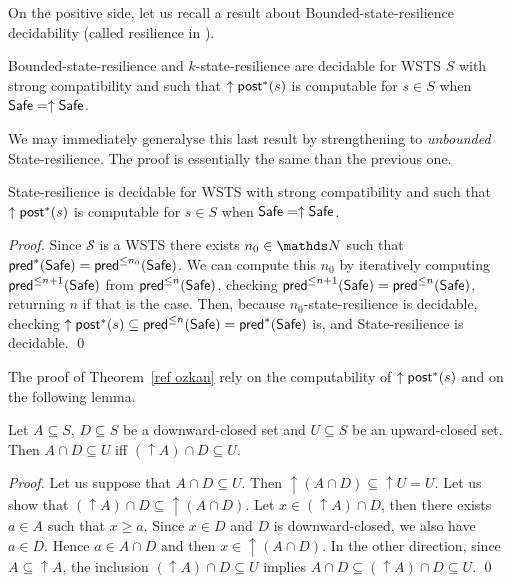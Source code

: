 On the positive side, let us recall a result about {\sc Bounded-state-resilience} decidability (called resilience in \cite{DBLP:conf/gg/Ozkan22,DBLP:journals/corr/abs-2108-00889}).
\begin{theorem}\cite{DBLP:conf/gg/Ozkan22,DBLP:journals/corr/abs-2108-00889}\label{ref ozkan}
{\sc Bounded-state-resilience} and {\sc $k$-state-resilience} are decidable for WSTS $S$ with strong compatibility and such that $\uparrow \textsf{post}^*(s)$ is computable for $s \in S$
when
$\textsf{Safe}=\uparrow \textsf{Safe}$.
\end{theorem}

We may immediately generalyse this last result by strengthening to \emph{unbounded} {\sc State-resilience}. The proof is essentially the same than the previous one.

\begin{corollary}\label{postcomputable}
{\sc State-resilience} is decidable for WSTS with strong compatibility and such that $\uparrow \textsf{post}^*(s)$ is computable for $s \in S$
when
$\textsf{Safe}=\uparrow \textsf{Safe}$.
\end{corollary}

\begin{proof}
Since $\mathscr{S}$ is a WSTS there exists $n_0 \in \N$ such that
$\textsf{pred}^*(\textsf{Safe}) =  \textsf{pred}^{\leq n_0}(\textsf{Safe})$. We can compute this $n_0$ by iteratively computing 
$\textsf{pred}^{\leq n+1}(\textsf{Safe})$ from $\textsf{pred}^{\leq n}(\textsf{Safe})$, checking 
$\textsf{pred}^{\leq n+1}(\textsf{Safe}) = \textsf{pred}^{\leq n}(\textsf{Safe})$, 
returning $n$ if that is the case.
Then, because {\sc $n_0$-state-resilience} is decidable, 
checking $\uparrow \post^*(s) %
 \subseteq \pred^{\leq n}(\Safe) = \pred^*(\Safe)$ is,
and {\sc State-resilience} is decidable. \qed
\end{proof}

The proof of Theorem~\ref{ref ozkan} rely on the computability of $\uparrow \textsf{post}^*(s)$ and on the following lemma.

\begin{lemma}\label{Lemma intersection}
Let $A \subseteq S$, $D \subseteq S$ be a downward-closed set and $U \subseteq S$ be an upward-closed set. 
Then $A \cap D \subseteq U$  iff $ (\uparrow  A) \cap D \subseteq U$.
\end{lemma}


\begin{proof}
Let us suppose that $A \cap D \subseteq U$. Then ${\uparrow (A \cap D)} \subseteq {\uparrow U} = U$.
Let us show that $({\uparrow A}) \cap D \subseteq {\uparrow (A \cap D)}$.
Let $x \in ({\uparrow A}) \cap D$, then there exists $a \in A$ such that $x \geq a$.
Since $x \in D$ and $D$ is downward-closed, we also have $a \in D$.
Hence $a \in A \cap D$ and then $x \in { \uparrow (A \cap D)}$.
In the other direction,
since $A \subseteq {\uparrow A}$, the inclusion
$({\uparrow  A}) \cap D \subseteq U$ implies
$A \cap D \subseteq ({\uparrow  A}) \cap D \subseteq U$. \qed
\end{proof}




